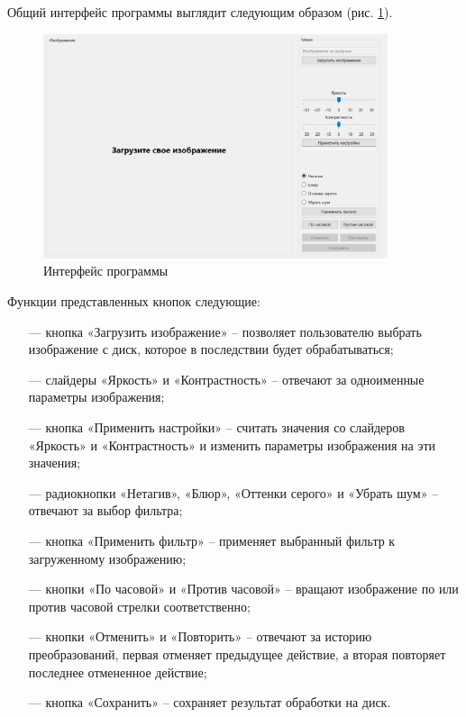 Общий интерфейс программы выглядит следующим образом (рис. \ref{fig:spire31}).

\begin{figure}[hbtp]
	\centering
	\includegraphics[width=0.9\textwidth]{img/res1.png}
	\caption{\label{fig:spire31} Интерфейс программы}
\end{figure}

Функции представленных кнопок следующие:

\begin{itemize}[leftmargin=1.6\parindent]
	\item[---] кнопка «Загрузить изображение» -- позволяет пользователю выбрать изображение с диск, которое в последствии будет обрабатываться;
	\item[---] слайдеры «Яркость» и «Контрастность» -- отвечают за одноименные параметры изображения;
	\item[---] кнопка «Применить настройки» -- считать значения со слайдеров «Яркость» и «Контрастность» и изменить параметры изображения на эти значения;
	\item[---] радиокнопки «Нетагив», «Блюр», «Оттенки серого» и «Убрать шум» -- отвечают за выбор фильтра;
	\item[---] кнопка «Применить фильтр» -- применяет выбранный фильтр к загруженному изображению;
	\item[---] кнопки «По часовой» и «Против часовой» -- вращают изображение по или против часовой стрелки соответственно;
	\item[---] кнопки «Отменить» и «Повторить» -- отвечают за историю преобразований, первая отменяет предыдущее действие, а вторая повторяет последнее отмененное действие;
	\item[---] кнопка «Сохранить» -- сохраняет результат обработки на диск.
\end{itemize}

